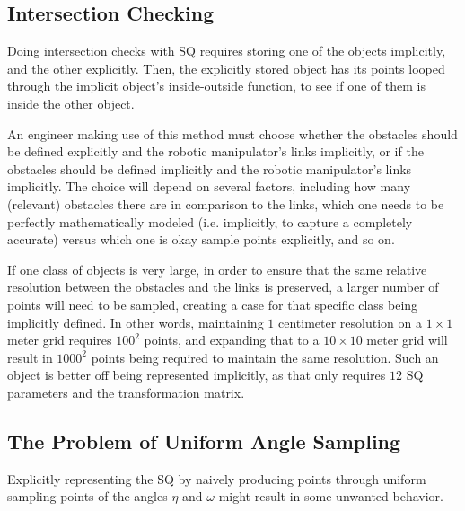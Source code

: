 \subsection{Intersection Checking} \label{subsec:SQIntersect}

Doing intersection checks with \gls{SQ} requires storing one of the objects implicitly, and the other explicitly. Then, the explicitly stored object has its points looped through the implicit object's inside-outside function, to see if one of them is inside the other object. 

An engineer making use of this method must choose whether the obstacles should be defined explicitly and the robotic manipulator's links implicitly, or if the obstacles should be defined implicitly and the robotic manipulator's links implicitly. The choice will depend on several factors, including how many (relevant) obstacles there are in comparison to the links, which one needs to be perfectly mathematically modeled (i.e. implicitly, to capture a completely accurate) versus which one is okay sample points explicitly, and so on. 

If one class of objects is very large, in order to ensure that the same relative resolution between the obstacles and the links is preserved, a larger number of points will need to be sampled, creating a case for that specific class being implicitly defined. In other words, maintaining $1$ centimeter resolution on a $1 \times 1$ meter grid requires $100^2$ points, and expanding that to a $10 \times 10$ meter grid will result in $1000^2$ points being required to maintain the same resolution. Such an object is better off being represented implicitly, as that only requires $12$ \gls{SQ} parameters and the transformation matrix.



\subsection{The Problem of Uniform Angle Sampling} \label{subsec:UniSampleProblem}

%
%
Explicitly representing the \gls{SQ} by naively producing points through uniform sampling points of the angles $\eta$ and $\omega$ might result in some unwanted behavior. 

